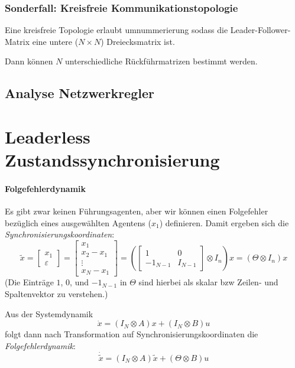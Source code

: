 \subsubsection{Sonderfall: Kreisfreie Kommunikationstopologie}
Eine kreisfreie Topologie erlaubt umnummerierung sodass die
Leader-Follower-Matrix eine untere ($N\times N$) Dreiecksmatrix ist.

Dann können $N$ unterschiedliche Rückführmatrizen bestimmt werden.

\subsection{Analyse Netzwerkregler}



\section{Leaderless Zustandssynchronisierung}
\paragraph{Folgefehlerdynamik}
Es gibt zwar keinen Führungsagenten, aber wir können einen Folgefehler
bezüglich eines ausgewählten Agentens ($x_1$) definieren.
Damit ergeben sich die \emph{Synchronisierungskoordinaten}:
\begin{equation}
    \tilde{x} = \begin{bmatrix}
        x_1 \\
        \varepsilon
    \end{bmatrix}
    = \begin{bmatrix}
        x_1 \\
        x_2 - x_1 \\
        \vdots \\
        x_N - x_1
    \end{bmatrix}
    = \left(\begin{bmatrix}
        1 & 0 \\
        -1_{N-1} & I_{N-1}
    \end{bmatrix}
    \otimes I_n
    \right) x
    = (\Theta \otimes I_n)x
\end{equation}
(Die Einträge $1$, $0$, und $-1_{N-1}$ in $\Theta$ sind hierbei als skalar bzw Zeilen- und Spaltenvektor zu verstehen.)

Aus der Systemdynamik
\begin{equation}
    \dot{x} = (I_N \otimes A) x + (I_N \otimes B)u
\end{equation}
folgt dann nach Transformation auf Synchronisierungskoordinaten die
\emph{Folgefehlerdynamik}:
\begin{equation}
    \dot{\tilde{x}} = (I_N \otimes A) \tilde{x} + (\Theta \otimes B)u
\end{equation}

